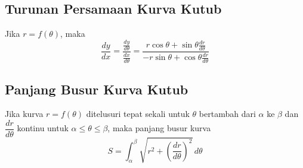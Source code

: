 \documentclass{article}
\begin{document}
\subsection{Turunan Persamaan Kurva Kutub}
Jika $r=f(\theta)$, maka 
$$ \dfrac{dy}{dx} = \dfrac{\frac{dy}{d\theta}}{\frac{dx}{d\theta}} = \dfrac{r\cos\theta +\sin\theta \frac{dr}{d\theta}}{-r\sin\theta+\cos\theta \frac{dr}{d\theta}} $$
\subsection{Panjang Busur Kurva Kutub}
Jika kurva $r=f(\theta)$ ditelusuri tepat sekali untuk $\theta$ bertambah dari $\alpha$ ke $\beta$ dan $\dfrac{dr}{d\theta}$ kontinu untuk $\alpha\leq \theta\leq \beta$, maka panjang busur kurva
$$ S=\int_\alpha^\beta \sqrt{r^2+\left(\dfrac{dr}{d\theta}\right)^2}\, d\theta $$
\end{document}
